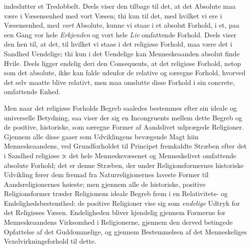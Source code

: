 \documentclass[12pt,a4paper]{book}
\newcommand{\opage}[1]{\marginnote{\footnotesize\textit{[#1]}}}
\begin{document}
indeslutter et Tredobbelt. Deels viser den tilbage til det, at det Absolute maa
være i Væsensenhed med \opage{33}vort Væsen; thi kun til det, med hvilket vi ere i
Væsensenhed, med \emph{vort} Absolute, kunne vi staae i et absolut Forhold, i et, paa
een Gang vor hele \emph{Erkjenden} og vort hele \emph{Liv} omfattende Forhold. Deels viser den
hen til, at det, til hvilket vi staae i det religiøse Forhold, maa være det i
Sandhed Uendelige; thi kun i det Uendelige kan Menneskeaanden absolut finde
Hvile. Deels ligger endelig deri den Consequents, at det religiøse Forhold, netop
som det absolute, ikke kan falde udenfor de relative og særegne Forhold, hvorved
det selv maatte blive relativt, men maa omslutte disse Forhold i sin concrete,
omfattende Enhed.

Men naar det religiøse Forholds Begreb saaledes bestemmes efter sin ideale og
universelle Betydning, saa viser der sig en Incongruents mellem dette Begreb og
de positive, historiske, som særegne Former af Aandslivet udprægede Religioner.
Gjennem alle disse gaaer som Udviklingens bevægende Magt hiin Menneskeaandens,
ved Grundforholdet til Principet fremkaldte Stræben efter det i Sandhed religiøse
ɔ: det hele Menneskevæsenet og Menneskelivet omfattende absolute Forhold; det er
denne Stræben, der under Religionsformernes historiske Udvikling fører dem fremad
fra Naturreligionernes laveste Former til Aandsreligionernes høieste; men gjennem
alle de historiske, positive Religionsformer træder Religionens ideale Begreb
frem i en Relativitets- og Endelighedsbestemthed: de positive Religioner vise sig
som \emph{endelige} Udtryk for det Religiøses Væsen. Endeligheden bliver kjendelig
gjennem Formerne for Menneskeaandens Virksomhed i Religionerne, gjennem den
derved betingede Opfattelse af det Guddommelige, og gjennem Bestemmelsen af det
Menneskeliges Vexelvirkningsforhold til dette.
\end{document}
